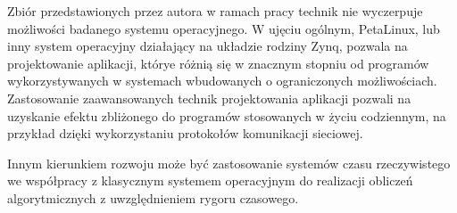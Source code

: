 Zbiór przedstawionych przez autora w ramach pracy technik nie wyczerpuje możliwości badanego systemu operacyjnego. W ujęciu ogólnym, PetaLinux, lub inny system operacyjny działający na układzie rodziny Zynq, pozwala na projektowanie aplikacji, którye różnią się w znacznym stopniu od programów wykorzystywanych w systemach wbudowanych o ograniczonych możliwościach. Zastosowanie zaawansowanych technik projektowania aplikacji pozwali na uzyskanie efektu zbliżonego do programów stosowanych w życiu codziennym, na przykład dzięki wykorzystaniu protokołów komunikacji sieciowej.

Innym kierunkiem rozwoju może być zastosowanie systemów czasu rzeczywistego we współpracy z klasycznym systemem operacyjnym do realizacji obliczeń algorytmicznych z uwzględnieniem rygoru czasowego.